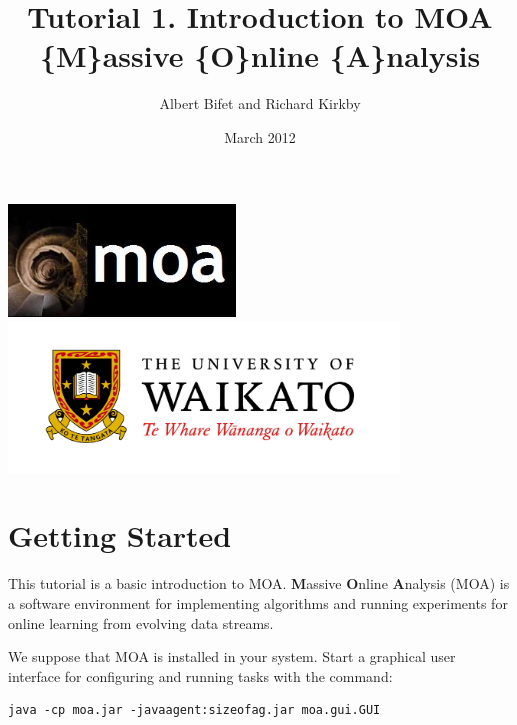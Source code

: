 \documentclass[a4paper,12pt]{article}
\title{Tutorial 1. Introduction to MOA \\ \{M\}assive \{O\}nline \{A\}nalysis}
\author{Albert Bifet and Richard Kirkby}
\date{March 2012}
\begin{document}
\lstset{language=Java,basicstyle=\tiny,numbers=left}
\maketitle
\begin{center}
\includegraphics[height=3cm]{images/LogoMOA.jpg} \\
\includegraphics[height=4cm]{images/Waikato.jpg} \\ 
\end{center}
\thispagestyle{empty}
\newpage
\setcounter{page}{1}

\section{Getting Started}

This tutorial is a basic introduction to MOA.
{\bf M}assive {\bf O}nline {\bf A}nalysis (MOA) is a  
software environment for implementing algorithms and running experiments
for online learning from 
evolving data streams.


We suppose that MOA is installed in your system.
Start a graphical user interface for configuring and running tasks with the command:

\begin{verbatim}
java -cp moa.jar -javaagent:sizeofag.jar moa.gui.GUI
\end{verbatim}
\end{document}
